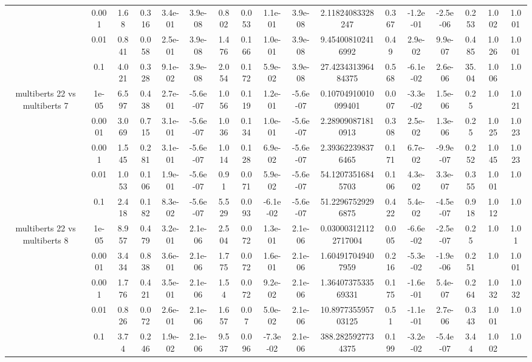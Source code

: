 \begin{tabular}{|c|c|c|c|c|c|c|c|c|c|c|c|c|c|c|c|c|}
 & 0.001 & 1.68 & 0.316 & 3.4e-01 & 3.9e-08 & 0.802 & 0.053 & 1.1e-01 & 3.9e-08 & 2.11824083328247 & 0.367 & -1.2e-01 & -2.5e-06 & 0.253 & 1.002 & 1.001 \\
 & 0.01 & 0.841 & 0.058 & 2.5e-01 & 3.9e-08 & 1.476 & 0.166 & 1.0e-01 & 3.9e-08 & 9.454008102416992 & 0.49 & 2.9e-02 & 9.9e-07 & 0.485 & 1.026 & 1.001 \\
 & 0.1 & 4.021 & 0.328 & 9.1e-02 & 3.9e-08 & 2.054 & 0.172 & 5.9e-02 & 3.9e-08 & 27.423431396484375 & 0.568 & -6.1e-02 & 2.6e-06 & 35.04 & 1.006 & 1.0 \\
\hline
\multirow{5}{*}{multiberts 22 vs multiberts 7} & 1e-05 & 6.597 & 0.438 & 2.7e-01 & -5.6e-07 & 1.056 & 0.119 & 1.2e-01 & -5.6e-07 & 0.10704910010099401 & 0.007 & -3.3e-02 & 1.5e-06 & 0.25 & 1.0 & 1.021 \\
 & 0.0001 & 3.069 & 0.715 & 3.1e-01 & -5.6e-07 & 1.036 & 0.134 & 1.0e-01 & -5.6e-07 & 2.289090871810913 & 0.308 & 2.5e-02 & 1.3e-06 & 0.25 & 1.025 & 1.023 \\
 & 0.001 & 1.545 & 0.281 & 3.1e-01 & -5.6e-07 & 1.014 & 0.128 & 6.9e-02 & -5.6e-07 & 2.393622398376465 & 0.171 & 6.7e-02 & -9.9e-07 & 0.252 & 1.045 & 1.023 \\
 & 0.01 & 1.053 & 0.106 & 1.9e-01 & -5.6e-07 & 0.91 & 0.071 & 5.9e-02 & -5.6e-07 & 54.12073516845703 & 0.106 & 4.3e-02 & 3.3e-07 & 0.355 & 1.001 & 1.0 \\
 & 0.1 & 2.418 & 0.182 & 8.3e-02 & -5.6e-07 & 5.529 & 0.093 & -6.1e-02 & -5.6e-07 & 51.22967529296875 & 0.422 & 5.4e-02 & -4.5e-07 & 0.918 & 1.012 & 1.0 \\
\hline
\multirow{5}{*}{multiberts 22 vs multiberts 8} & 1e-05 & 8.957 & 0.479 & 3.2e-01 & 2.1e-06 & 2.504 & 0.072 & 1.3e-01 & 2.1e-06 & 0.030003121122717004 & 0.005 & -6.6e-02 & -2.5e-07 & 0.25 & 1.0 & 1.01 \\
 & 0.0001 & 3.434 & 0.838 & 3.6e-01 & 2.1e-06 & 1.775 & 0.072 & 1.6e-01 & 2.1e-06 & 1.604917049407959 & 0.216 & -5.3e-02 & -1.9e-06 & 0.251 & 1.0 & 1.001 \\
 & 0.001 & 1.776 & 0.421 & 3.5e-01 & 2.1e-06 & 1.54 & 0.072 & 9.2e-02 & 2.1e-06 & 1.3640737533569331 & 0.175 & -1.6e-01 & 5.4e-07 & 0.264 & 1.032 & 1.032 \\
 & 0.01 & 0.826 & 0.072 & 2.6e-01 & 2.1e-06 & 1.657 & 0.07 & 5.0e-02 & 2.1e-06 & 10.897735595703125 & 0.51 & -1.1e-01 & 2.7e-06 & 0.343 & 1.001 & 1.0 \\
 & 0.1 & 3.74 & 0.246 & 1.9e-02 & 2.1e-06 & 9.537 & 0.096 & -7.3e-02 & 2.1e-06 & 388.2825927734375 & 0.199 & -3.2e-02 & -5.4e-07 & 3.44 & 1.002 & 1.0 \\

\end{tabular}
